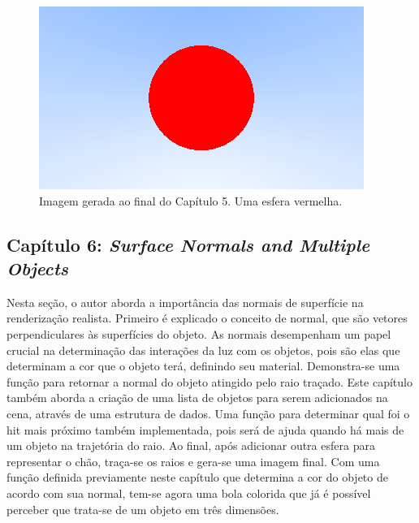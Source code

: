 \documentclass[journal]{IEEEtran}
\begin{document}
\begin{figure}[ht]
  \centering
  \includegraphics[width=\linewidth]{media/img-1.03-red-sphere.png}
  \caption{Imagem gerada ao final do Capítulo 5. Uma esfera vermelha.}
  \label{img_red_sphere}
\end{figure}

\subsection*{Capítulo 6: \emph{Surface Normals and Multiple Objects}}
Nesta seção, o autor aborda a importância das normais de superfície na renderização realista. Primeiro é
explicado o conceito de normal, que são vetores perpendiculares às superfícies do objeto. As normais 
desempenham um papel crucial na determinação das interações da luz com os objetos, pois são elas que
determinam a cor que o objeto terá, definindo seu material. Demonstra-se uma função para retornar a normal
do objeto atingido pelo raio traçado. Este capítulo também aborda a criação de uma lista de objetos para
serem adicionados na cena, através de uma estrutura de dados. Uma função para determinar qual foi o
hit mais próximo também implementada, pois será de ajuda quando há mais de um objeto na trajetória do raio.
Ao final, após adicionar outra esfera para representar o chão, traça-se os raios e gera-se uma imagem final.
Com uma função definida previamente neste capítulo que determina a cor do objeto de acordo com sua normal,
tem-se agora uma bola colorida que já é possível perceber que trata-se de um objeto em três dimensões.
\end{document}
